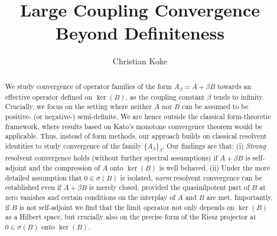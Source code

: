 \documentclass[reqno,12pt,letterpaper]{amsart}
\title[Large Coupling Limits Beyond Definiteness
]{Large Coupling Convergence Beyond Definiteness
}
\author{Christian Koke}
\numberwithin{equation}{section}
\newcommand{\1}{\mathds{1}}
\theoremstyle{definition}
\begin{document}
	
	\vspace*{-5mm}
	
	\maketitle
	
	
	\begin{abstract}
		We study convergence of operator families of the form \(A_\beta = A + \beta B \) towards an effective operator defined on $\ker(B)$, as the coupling constant $\beta$ tends to infinity. Crucially, we focus on the setting where neither $A$ nor $B$ can be assumed to be positive- (or negative-) semi-definite.  We are hence outside the classical form-theoretic framework, where results based on Kato’s monotone convergence theorem would be applicable. 
		Thus, instead of form methods, our approach  builds on classical resolvent identities to study convergence of the family $\{A_\beta\}_{\beta}$. Our findings are that: (i) \emph{Strong} resolvent convergence holds (without further spectral assumptions) if $A + \beta B$ is self-adjoint  and the compression of $A$ onto $\ker(B)$ is well behaved.  (ii) Under the more detailed assumption that $0 \in \sigma(B)$  is isolated,  \emph{norm} resolvent convergence can be established even if $A+\beta B$ is merely closed, provided the quasinilpotent part of $B$ at zero vanishes and certain conditions on the interplay of $A$ and $B$ are met. Importantly, if $B$ is not self-adjoint we find that the limit operator not only depends on $\ker(B)$ as a Hilbert space, but crucially also on the precise form of the Riesz projector at $0 \in \sigma(B)$ onto $\ker(B)$.
	\end{abstract}

	
\end{document}
